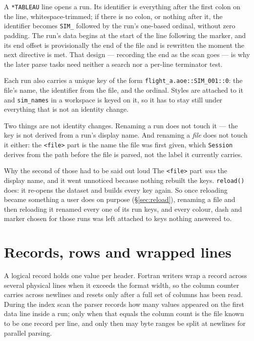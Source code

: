 \documentclass[11pt,a4paper,oneside]{report}
\newcommand{\code}[1]{\texttt{#1}}
\begin{document}
A \code{*TABLEAU} line opens a run. Its identifier is everything after the first
colon on the line, whitespace-trimmed; if there is no colon, or nothing after it,
the identifier becomes \code{SIM\_} followed by the run's one-based ordinal,
without zero padding. The run's data begins at the start of the line following
the marker, and its end offset is provisionally the end of the file and is
rewritten the moment the next directive is met. That design --- recording the end
as the scan goes --- is why the later parse tasks need neither a search nor a
per-line terminator test.

Each run also carries a unique key of the form
\code{flight\_a.aoe::SIM\_001::0}: the file's name, the identifier from the
file, and the ordinal. Styles are attached to it and \code{sim\_names} in a
workspace is keyed on it, so it has to stay still under everything that is not
an identity change.

Two things are not identity changes. Renaming a run does not touch it --- the
key is not derived from a run's display name. And renaming a \emph{file} does
not touch it either: the \code{<file>} part is the name the file was first
given, which \code{Session} derives from the path before the file is parsed,
not the label it currently carries.

\begin{aoenote}{Why the second of those had to be said out loud}
The \code{<file>} part \emph{was} the display name, and it went unnoticed
because nothing rebuilt the keys. \code{reload()} does: it re-opens the dataset
and builds every key again. So once reloading became something a user does on
purpose (\S\ref{sec:reload}), renaming a file and then reloading it renamed
every one of its run keys, and every colour, dash and marker chosen for those
runs was left attached to keys nothing answered to.
\end{aoenote}

\section{Records, rows and wrapped lines}

A logical record holds one value per header. Fortran writers wrap a record across
several physical lines when it exceeds the format width, so the column counter
carries across newlines and resets only after a full set of columns has been
read. During the index scan the parser records how many values appeared on the
first data line inside a run; only when that equals the column count is the file
known to be one record per line, and only then may byte ranges be split at
newlines for parallel parsing.
\end{document}
